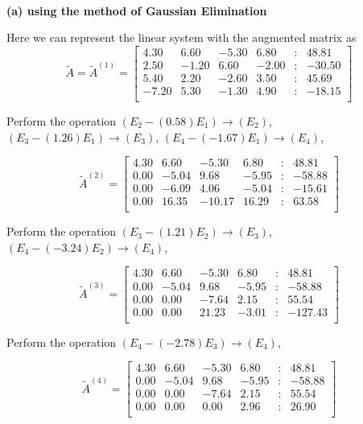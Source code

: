 \begin{solution}\ \\

\textbf{(a) using the method of Gaussian Elimination}


Here we can represent the linear system with the augmented matrix as
$$ 
\tilde A=\tilde A^{(1)}=
 \begin{bmatrix} 
    4.30 &     6.60 &    -5.30 &     6.80 & : &    48.81 \\ 
    2.50 &    -1.20 &     6.60 &    -2.00 & : &   -30.50 \\ 
    5.40 &     2.20 &    -2.60 &     3.50 & : &    45.69 \\ 
   -7.20 &     5.30 &    -1.30 &     4.90 & : &   -18.15 \\ 
\end{bmatrix} 
$$ 


Perform the operation 
 $ ( E_{2} - (0.58) E_{1}) \rightarrow (E_{2}) $,  $ ( E_{3} - (1.26) E_{1}) \rightarrow (E_{3}) $,  $ ( E_{4} - (-1.67) E_{1}) \rightarrow (E_{4}) $, 
 
$$ 
\tilde A^{(2)}=
 \begin{bmatrix} 
    4.30 &     6.60 &    -5.30 &     6.80 & : &    48.81 \\ 
    0.00 &    -5.04 &     9.68 &    -5.95 & : &   -58.88 \\ 
    0.00 &    -6.09 &     4.06 &    -5.04 & : &   -15.61 \\ 
    0.00 &    16.35 &   -10.17 &    16.29 & : &    63.58 \\ 
\end{bmatrix} 
 $$ 

 
Perform the operation 
 $ ( E_{3} - (1.21) E_{2}) \rightarrow (E_{3}) $,  $ ( E_{4} - (-3.24) E_{2}) \rightarrow (E_{4}) $, 
 
$$ 
\tilde A^{(3)}=
 \begin{bmatrix} 
    4.30 &     6.60 &    -5.30 &     6.80 & : &    48.81 \\ 
    0.00 &    -5.04 &     9.68 &    -5.95 & : &   -58.88 \\ 
    0.00 &     0.00 &    -7.64 &     2.15 & : &    55.54 \\ 
    0.00 &     0.00 &    21.23 &    -3.01 & : &  -127.43 \\ 
\end{bmatrix} 
 $$ 

 
Perform the operation 
 $ ( E_{4} - (-2.78) E_{3}) \rightarrow (E_{4}) $, 
 
$$ 
\tilde A^{(4)}=
 \begin{bmatrix} 
    4.30 &     6.60 &    -5.30 &     6.80 & : &    48.81 \\ 
    0.00 &    -5.04 &     9.68 &    -5.95 & : &   -58.88 \\ 
    0.00 &     0.00 &    -7.64 &     2.15 & : &    55.54 \\ 
    0.00 &     0.00 &     0.00 &     2.96 & : &    26.90 \\ 
\end{bmatrix} 
 $$


\end{solution}
